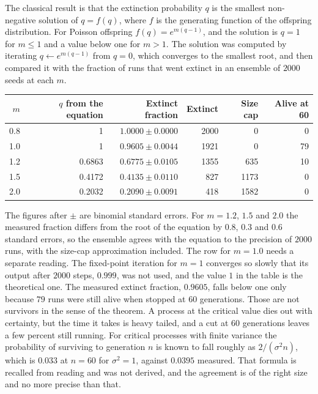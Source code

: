 The classical result is that the extinction probability $q$ is the smallest non-negative solution of $q=f(q)$, where $f$ is the generating function of the offspring distribution. For Poisson offspring $f(q)=e^{m(q-1)}$, and the solution is $q=1$ for $m\le1$ and a value below one for $m>1$. The solution was computed by iterating $q\leftarrow e^{m(q-1)}$ from $q=0$, which converges to the smallest root, and then compared it with the fraction of runs that went extinct in an ensemble of $2000$ seeds at each $m$.

\begin{center}
\begin{tabular}{rrrrrr}
\toprule
$m$ & $q$ from the equation & Extinct fraction & Extinct & Size cap & Alive at 60\\
\midrule
0.8 & 1 & $1.0000\pm0.0000$ & 2000 & 0 & 0\\
1.0 & 1 & $0.9605\pm0.0044$ & 1921 & 0 & 79\\
1.2 & 0.6863 & $0.6775\pm0.0105$ & 1355 & 635 & 10\\
1.5 & 0.4172 & $0.4135\pm0.0110$ & 827 & 1173 & 0\\
2.0 & 0.2032 & $0.2090\pm0.0091$ & 418 & 1582 & 0\\
\bottomrule
\end{tabular}
\end{center}

The figures after $\pm$ are binomial standard errors. For $m=1.2$, $1.5$ and $2.0$ the measured fraction differs from the root of the equation by $0.8$, $0.3$ and $0.6$ standard errors, so the ensemble agrees with the equation to the precision of $2000$ runs, with the size-cap approximation included. The row for $m=1.0$ needs a separate reading. The fixed-point iteration for $m=1$ converges so slowly that its output after $2000$ steps, $0.999$, was not used, and the value $1$ in the table is the theoretical one. The measured extinct fraction, $0.9605$, falls below one only because $79$ runs were still alive when stopped at $60$ generations. Those are not survivors in the sense of the theorem. A process at the critical value dies out with certainty, but the time it takes is heavy tailed, and a cut at $60$ generations leaves a few percent still running. For critical processes with finite variance the probability of surviving to generation $n$ is known to fall roughly as $2/(\sigma^2 n)$, which is $0.033$ at $n=60$ for $\sigma^2=1$, against $0.0395$ measured. That formula is recalled from reading and was not derived, and the agreement is of the right size and no more precise than that.

